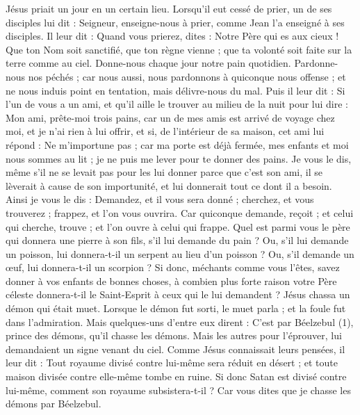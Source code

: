 \begin{multicols}{2}
\TextTitle{[grandeur]}
\VerseOne{}Jésus priait un jour en un certain lieu. Lorsqu’il eut cessé de prier, un de ses disciples lui dit : Seigneur, enseigne-nous à prier, comme Jean l’a enseigné à ses disciples.
Il leur dit : Quand vous prierez, dites : Notre Père qui es aux cieux ! Que ton Nom soit sanctifié, que ton règne vienne ; que ta volonté soit faite sur la terre comme au ciel.
Donne-nous chaque jour notre pain quotidien.
Pardonne-nous nos péchés ; car nous aussi, nous pardonnons à quiconque nous offense ; et ne nous induis point en tentation, mais délivre-nous du mal.
Puis il leur dit : Si l’un de vous a un ami, et qu’il aille le trouver au milieu de la nuit pour lui dire : Mon ami, prête-moi trois pains,
car un de mes amis est arrivé de voyage chez moi, et je n’ai rien à lui offrir,
et si, de l’intérieur de sa maison, cet ami lui répond : Ne m'importune pas ; car ma porte est déjà fermée, mes enfants et moi nous sommes au lit ; je ne puis me lever pour te donner des pains.
Je vous le dis, même s’il ne se levait pas pour les lui donner parce que c’est son ami, il se lèverait à cause de son importunité, et lui donnerait tout ce dont il a besoin.
Ainsi je vous le dis : Demandez, et il vous sera donné ; cherchez, et vous trouverez ; frappez, et l’on vous ouvrira.
Car quiconque demande, reçoit ; et celui qui cherche, trouve ; et l’on ouvre à celui qui frappe.
Quel est parmi vous le père qui donnera une pierre à son fils, s’il lui demande du pain ? Ou, s’il lui demande un poisson, lui donnera-t-il un serpent au lieu d’un poisson ?
Ou, s'il demande un œuf, lui donnera-t-il un scorpion ?
Si donc, méchants comme vous l’êtes, savez donner à vos enfants de bonnes choses, à combien plus forte raison votre Père céleste donnera-t-il le Saint-Esprit à ceux qui le lui demandent ?
Jésus chassa un démon qui était muet. Lorsque le démon fut sorti, le muet parla ; et la foule fut dans l’admiration.
\TextTitle{[grandeur]}
Mais quelques-uns d'entre eux dirent : C’est par Béelzebul (1), prince des démons, qu'il chasse les démons.
Mais les autres pour l'éprouver, lui demandaient un signe venant du ciel.
Comme Jésus connaissait leurs pensées, il leur dit : Tout royaume divisé contre lui-même sera réduit en désert ; et toute maison divisée contre elle-même tombe en ruine.
Si donc Satan est divisé contre lui-même, comment son royaume subsistera-t-il ? Car vous dites que je chasse les démons par Béelzebul.

\end{multicols}
